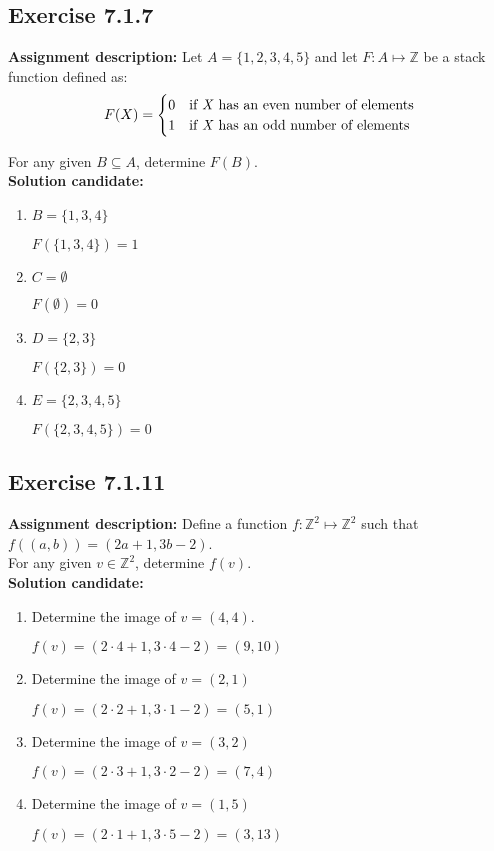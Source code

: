 \documentclass{report}
\newcommand{\cent}[1]{\begin{center}#1\end{center}}
\newcommand{\doubleZ}{\mathbb{Z}}
\newcommand{\In}{\! \in \!}
\newcommand{\assignmentDescription}{\textbf{Assignment description: }}
\newcommand{\solution}{\textbf{Solution candidate: }}
\newcommand{\Exercise}[1]{\subsection{Exercise #1}}
\newcommand{\defaultEnumerateLabel}{\textbf{\alph*.}}
\begin{document}
 \Exercise{7.1.7}
 
 \assignmentDescription
 Let $A=\{1,2,3,4,5\}$ and let $F : A \mapsto \doubleZ$ be a stack function defined as:
 \[ F(X) = 
 \begin{cases}
 	0 &  \text{if \textit{X} has an even number of elements} \\
 	1 &  \text{if \textit{X} has an odd number of elements}
 \end{cases} 
 	\]
 	
 	For any given $B \subseteq A$, determine $F(B)$.\\
 	
 	\solution
 	\begin{enumerate}[label=\defaultEnumerateLabel]
 		\item $B= \{1,3,4\}$
 		
 		\cent{$F(\{1,3,4\}) = 1$}
 		
 		\item $C = \emptyset$
 		
 		\cent{$F(\emptyset) = 0$}
 		
 		\item $D = \{2,3\}$
 		
 		\cent{$ F(\{2,3\}) = 0 $}
 		
 		\item $E = \{2,3,4,5\}$
 		
 		\cent{$ F(\{2,3,4,5\}) = 0 $}
 	\end{enumerate}
 
 	\Exercise{7.1.11}
 	
 	\assignmentDescription
 	Define a function $f : \doubleZ^2 \mapsto \doubleZ^2$ such that $f((a,b)) = (2a+1,3b-2)$. \\
 	
 	For any given $v \In \doubleZ^2$, determine $f(v)$.\\
 	
 	\solution
 	\begin{enumerate}[label=\defaultEnumerateLabel]
 		\item Determine the image of  $v = (4,4)$.
 		
 		\cent{$f(v) = (2\cdot 4 + 1,3 \cdot 4 - 2) = (9,10)$}
 		
 		\item Determine the image of $v = (2,1)$
 		
 		\cent{$f(v) = (2\cdot 2 + 1,3 \cdot 1 - 2) = (5,1)$}
 		
 		\item Determine the image of $v = (3,2)$
 		
 		\cent{$f(v) = (2\cdot 3 + 1,3 \cdot 2 - 2) = (7,4)$}
 		
 		\item Determine the image of $v=(1,5)$
 		
 		\cent{$f(v) = (2\cdot 1 + 1,3 \cdot 5 - 2) = (3,13)$}
 		
 	\end{enumerate}
 
\end{document}
